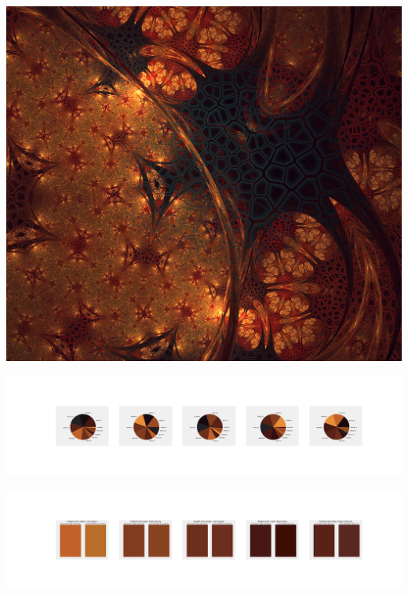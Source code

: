 \documentclass[11pt]{article}
\begin{document}
\begin{landscape}
    \begin{center}
    \includegraphics[width=\textwidth]{./nbimg/file (228).jpg}
    \end{center}

    \begin{center}
    \includegraphics[width=250mm]{./nbimg/pie-143.jpg}
    \end{center}

    \begin{center}
    \includegraphics[width=250mm]{./nbimg/peak-143.jpg}
    \end{center}
    


\end{landscape}
\end{document}
